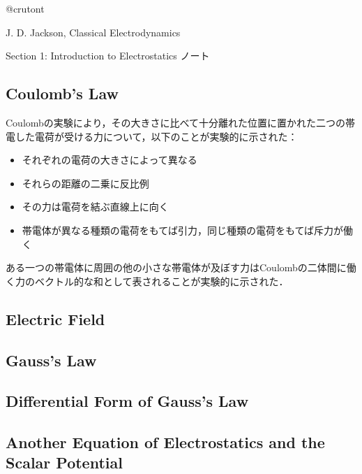 
\pagestyle{fancy}  
\fancyhead[L]{}  
\fancyhead[C]{}  
\fancyhead[R]{\textbf{\thepage}}  
\fancyfoot{}

\renewcommand{\contentsname}{Contents}

  
\begin{flushright}  
  @crutont
\end{flushright}
\begin{screen}
  \centering
  J. D. Jackson, Classical Electrodynamics

  Section 1: Introduction to Electrostatics ノート
\end{screen}

\setcounter{section}{1}
\tableofcontents
\hrulefill

\subsection{Coulomb's Law}
Coulombの実験により，その大きさに比べて十分離れた位置に置かれた二つの帯電した電荷が受ける力について，以下のことが実験的に示された：
\begin{itemize}  
  \item それぞれの電荷の大きさによって異なる
  \item それらの距離の二乗に反比例
  \item その力は電荷を結ぶ直線上に向く
  \item 帯電体が異なる種類の電荷をもてば引力，同じ種類の電荷をもてば斥力が働く
\end{itemize}
ある一つの帯電体に周囲の他の小さな帯電体が及ぼす力はCoulombの二体間に働く力のベクトル的な和として表されることが実験的に示された．

\subsection{Electric Field}

\subsection{Gauss's Law}

\subsection{Differential Form of Gauss's Law}
\subsection{Another Equation of Electrostatics and the Scalar Potential}
